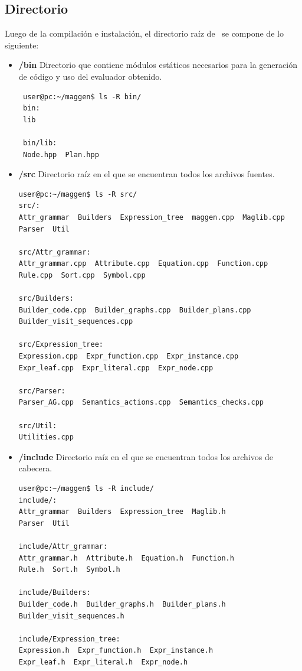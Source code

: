 \subsection{Directorio }
Luego de la compilación e instalación, el directorio raíz de \maggen\ se compone de lo siguiente:
\begin{itemize}
\item \textbf{/bin} Directorio que contiene módulos estáticos necesarios para la generación de código y uso del evaluador obtenido.
{\footnotesize \begin{verbatim}
 user@pc:~/maggen$ ls -R bin/
 bin:
 lib

 bin/lib:
 Node.hpp  Plan.hpp
\end{verbatim} }
 
\item \textbf{/src} Directorio raíz en el que se encuentran todos los archivos fuentes.
{\footnotesize \begin{verbatim}
user@pc:~/maggen$ ls -R src/ 
src/:
Attr_grammar  Builders  Expression_tree  maggen.cpp  Maglib.cpp  
Parser  Util

src/Attr_grammar:
Attr_grammar.cpp  Attribute.cpp  Equation.cpp  Function.cpp  
Rule.cpp  Sort.cpp  Symbol.cpp

src/Builders:
Builder_code.cpp  Builder_graphs.cpp  Builder_plans.cpp  
Builder_visit_sequences.cpp

src/Expression_tree:
Expression.cpp  Expr_function.cpp  Expr_instance.cpp  
Expr_leaf.cpp  Expr_literal.cpp  Expr_node.cpp

src/Parser:
Parser_AG.cpp  Semantics_actions.cpp  Semantics_checks.cpp

src/Util:
Utilities.cpp
\end{verbatim} }

\item \textbf{/include} Directorio raíz en el que se encuentran todos los archivos de cabecera.

{\footnotesize \begin{verbatim}
user@pc:~/maggen$ ls -R include/
include/:
Attr_grammar  Builders  Expression_tree  Maglib.h  
Parser  Util

include/Attr_grammar:
Attr_grammar.h  Attribute.h  Equation.h  Function.h  
Rule.h  Sort.h  Symbol.h

include/Builders:
Builder_code.h  Builder_graphs.h  Builder_plans.h  
Builder_visit_sequences.h

include/Expression_tree:
Expression.h  Expr_function.h  Expr_instance.h  
Expr_leaf.h  Expr_literal.h  Expr_node.h


\end{verbatim}}
\end{itemize}
